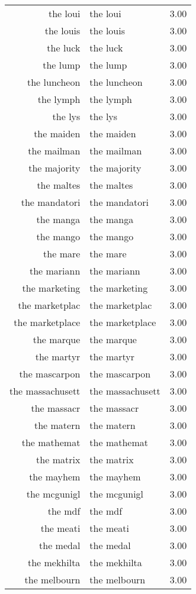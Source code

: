 \begin{table}[ht]
\begin{tabular}{rlr}
  the loui & the loui & 3.00 \\ 
  the louis & the louis & 3.00 \\ 
  the luck & the luck & 3.00 \\ 
  the lump & the lump & 3.00 \\ 
  the luncheon & the luncheon & 3.00 \\ 
  the lymph & the lymph & 3.00 \\ 
  the lys & the lys & 3.00 \\ 
  the maiden & the maiden & 3.00 \\ 
  the mailman & the mailman & 3.00 \\ 
  the majority & the majority & 3.00 \\ 
  the maltes & the maltes & 3.00 \\ 
  the mandatori & the mandatori & 3.00 \\ 
  the manga & the manga & 3.00 \\ 
  the mango & the mango & 3.00 \\ 
  the mare & the mare & 3.00 \\ 
  the mariann & the mariann & 3.00 \\ 
  the marketing & the marketing & 3.00 \\ 
  the marketplac & the marketplac & 3.00 \\ 
  the marketplace & the marketplace & 3.00 \\ 
  the marque & the marque & 3.00 \\ 
  the martyr & the martyr & 3.00 \\ 
  the mascarpon & the mascarpon & 3.00 \\ 
  the massachusett & the massachusett & 3.00 \\ 
  the massacr & the massacr & 3.00 \\ 
  the matern & the matern & 3.00 \\ 
  the mathemat & the mathemat & 3.00 \\ 
  the matrix & the matrix & 3.00 \\ 
  the mayhem & the mayhem & 3.00 \\ 
  the mcgunigl & the mcgunigl & 3.00 \\ 
  the mdf & the mdf & 3.00 \\ 
  the meati & the meati & 3.00 \\ 
  the medal & the medal & 3.00 \\ 
  the mekhilta & the mekhilta & 3.00 \\ 
  the melbourn & the melbourn & 3.00 \\ 

\end{tabular}
\end{table}
